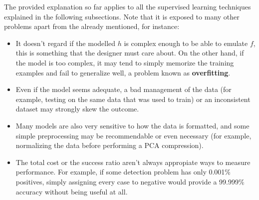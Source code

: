 The provided explanation so far applies to all the supervised learning techniques explained in the following subsections. Note that it is exposed to many other problems apart from the already mentioned, for instance:
\begin{itemize}
\item It doesn't regard if the modelled \(h\) is complex enough to be able to emulate \(f\), this is something that the designer must care about. On the other hand, if the model is too complex, it may tend to simply memorize the training examples and fail to generalize well, a problem known as \textbf{overfitting}.
\item Even if the model seems adequate, a bad management of the data (for example, testing on the same data that was used to train) or an inconsistent dataset may strongly skew the outcome.
\item Many models are also very sensitive to how the data is formatted, and some simple preprocessing may be recommendable or even necessary (for example, normalizing the data before performing a PCA compression).
\item The total cost or the success ratio aren’t always appropiate ways to measure performance. For example, if some detection problem has only 0.001\% positives, simply assigning every case to negative would provide a 99.999\% accuracy without being useful at all.
\end{itemize}






